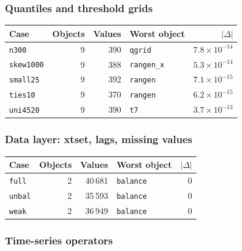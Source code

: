 \documentclass[
  10.5pt,
  a4paper,
]{article}
\begin{document}
\subsubsection*{Quantiles and threshold grids}

\begin{longtable}{@{}p{3.6cm}rrp{4.9cm}r@{}}
\toprule
Case & Objects & Values & Worst object & $|\Delta|$ \\
\midrule
\endhead
\texttt{n300} & 9 & 390 & \texttt{qgrid} & $7.8\times10^{-14}$ \\
\texttt{skew1000} & 9 & 388 & \texttt{rangen\_\allowbreak{}x} & $5.3\times10^{-14}$ \\
\texttt{small25} & 9 & 392 & \texttt{rangen} & $7.1\times10^{-15}$ \\
\texttt{ties10} & 9 & 370 & \texttt{rangen} & $6.2\times10^{-15}$ \\
\texttt{uni4520} & 9 & 390 & \texttt{t7} & $3.7\times10^{-13}$ \\
\bottomrule
\end{longtable}

\subsubsection*{Data layer: xtset, lags, missing values}

\begin{longtable}{@{}p{3.6cm}rrp{4.9cm}r@{}}
\toprule
Case & Objects & Values & Worst object & $|\Delta|$ \\
\midrule
\endhead
\texttt{full} & 2 & 40\,681 & \texttt{balance} & 0 \\
\texttt{unbal} & 2 & 35\,593 & \texttt{balance} & 0 \\
\texttt{weak} & 2 & 36\,949 & \texttt{balance} & 0 \\
\bottomrule
\end{longtable}

\subsubsection*{Time-series operators}
\end{document}
